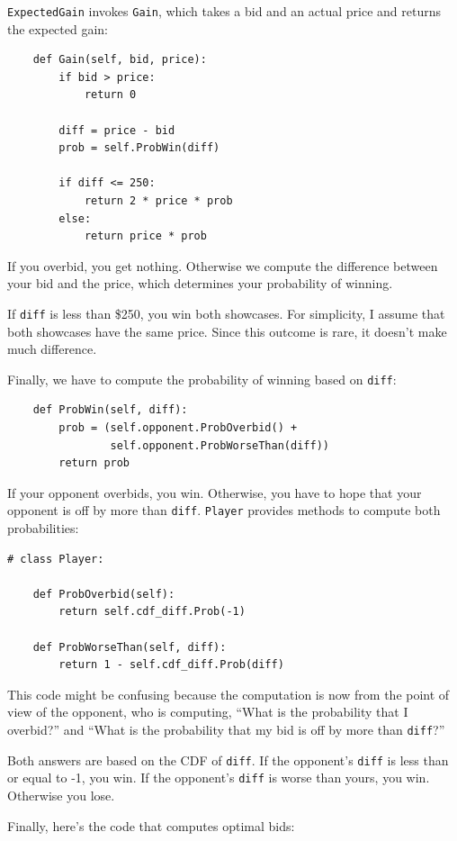 \documentclass[12pt]{book}
\begin{document}
{\tt ExpectedGain} invokes {\tt Gain}, which takes a bid and an actual
price and returns the expected gain:

\begin{verbatim}
    def Gain(self, bid, price):
        if bid > price:
            return 0

        diff = price - bid
        prob = self.ProbWin(diff)

        if diff <= 250:
            return 2 * price * prob
        else:
            return price * prob
\end{verbatim}

If you overbid, you get nothing.  Otherwise we compute 
the difference between your bid and the price, which determines
your probability of winning.

If {\tt diff} is less than \$250, you win both showcases.  For
simplicity, I assume that both showcases have the same price.  Since
this outcome is rare, it doesn't make much difference.

Finally, we have to compute the probability of winning based
on {\tt diff}:

\begin{verbatim}
    def ProbWin(self, diff):
        prob = (self.opponent.ProbOverbid() + 
                self.opponent.ProbWorseThan(diff))
        return prob
\end{verbatim}

If your opponent overbids, you win.  Otherwise, you have to hope
that your opponent is off by more than {\tt diff}.  {\tt Player}
provides methods to compute both probabilities:

\begin{verbatim}
# class Player:

    def ProbOverbid(self):
        return self.cdf_diff.Prob(-1)

    def ProbWorseThan(self, diff):
        return 1 - self.cdf_diff.Prob(diff)
\end{verbatim}

This code might be confusing because the computation is now from
the point of view of the opponent, who is computing, ``What is
the probability that I overbid?'' and ``What is the probability
that my bid is off by more than {\tt diff}?''

Both answers are based on the CDF of {\tt diff}.  If the opponent's
{\tt diff} is less than or equal to -1, you win.  If the opponent's
{\tt diff} is worse than yours, you win.  Otherwise you lose.

Finally, here's the code that computes optimal bids:
\end{document}
